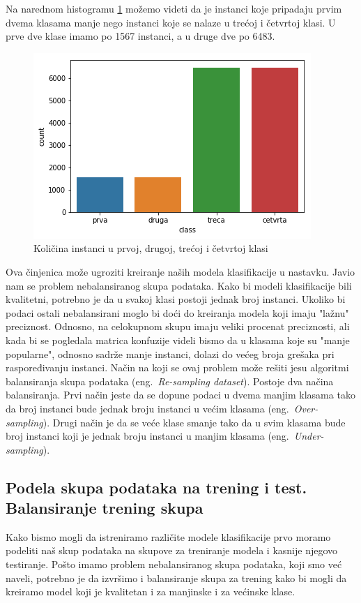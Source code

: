 \documentclass[a4paper]{article}
\begin{document}
Na narednom histogramu \ref{fig:klase_hist} možemo videti da je instanci koje pripadaju prvim dvema klasama manje nego instanci koje se nalaze u trećoj i četvrtoj klasi. U prve dve klase imamo po 1567 instanci, a u druge dve po 6483.
\newpage
\begin{figure}[h!]
\begin{center}
\includegraphics[scale=0.6]{klase_hist.png}
\end{center}
\caption{Količina instanci u prvoj, drugoj, trećoj i četvrtoj klasi}
\label{fig:klase_hist}
\end{figure}

Ova činjenica može ugroziti kreiranje naših modela klasifikacije u nastavku. Javio nam se problem nebalansiranog skupa podataka. Kako bi modeli klasifikacije bili kvalitetni, potrebno je da u svakoj klasi postoji jednak broj instanci. Ukoliko bi podaci ostali nebalansirani moglo bi doći do kreiranja modela koji imaju "lažnu" preciznost. Odnosno, na celokupnom skupu imaju veliki procenat preciznosti, ali kada bi se pogledala matrica konfuzije videli bismo da u klasama koje su "manje popularne", odnosno sadrže manje instanci, dolazi do većeg broja grešaka pri raspoređivanju instanci. Način na koji se ovaj problem može rešiti jesu algoritmi balansiranja skupa podataka (eng.~{\em Re-sampling dataset}). Postoje dva načina balansiranja. Prvi način jeste da se dopune podaci u dvema manjim klasama tako da broj instanci bude jednak broju instanci u većim klasama (eng.~{\em Over-sampling}). Drugi način je da se veće klase smanje tako da u svim klasama bude broj instanci koji je jednak broju instanci u manjim klasama (eng.~{\em Under-sampling}).

\subsection{Podela skupa podataka na trening i test. Balansiranje trening skupa}
Kako bismo mogli da istreniramo različite modele klasifikacije prvo moramo podeliti naš skup podataka na skupove za treniranje modela i kasnije njegovo testiranje. Pošto imamo problem nebalansiranog skupa podataka, koji smo već naveli, potrebno je da izvršimo i balansiranje skupa za trening kako bi mogli da kreiramo model koji je kvalitetan i za manjinske i za većinske klase. 
\end{document}
